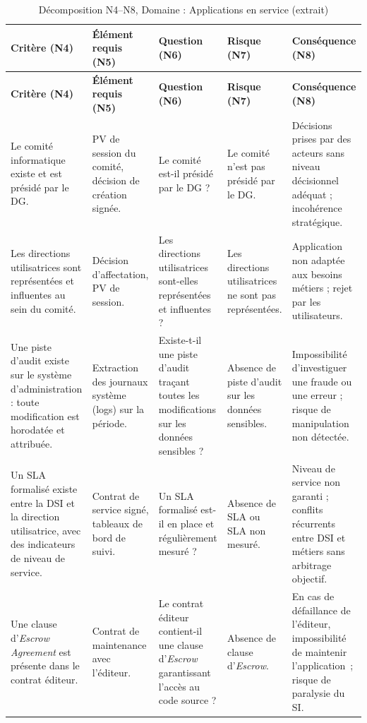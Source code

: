 \begin{longtable}{p{3cm} p{3cm} p{3cm} p{3cm} p{3cm}}
\caption{Décomposition N4--N8, Domaine : Applications en service (extrait)} \\

\toprule
\textbf{Critère (N4)} & \textbf{Élément requis (N5)} & \textbf{Question (N6)} & \textbf{Risque (N7)} & \textbf{Conséquence (N8)} \\
\midrule
\endfirsthead

\toprule
\textbf{Critère (N4)} & \textbf{Élément requis (N5)} & \textbf{Question (N6)} & \textbf{Risque (N7)} & \textbf{Conséquence (N8)} \\
\midrule
\endhead

\bottomrule
\endlastfoot

Le comité informatique existe et est présidé par le DG. &
PV de session du comité, décision de création signée. &
Le comité est-il présidé par le DG ? &
Le comité n'est pas présidé par le DG. &
Décisions prises par des acteurs sans niveau décisionnel adéquat ; incohérence stratégique. \\

\addlinespace

Les directions utilisatrices sont représentées et influentes au sein du comité. &
Décision d'affectation, PV de session. &
Les directions utilisatrices sont-elles représentées et influentes ? &
Les directions utilisatrices ne sont pas représentées. &
Application non adaptée aux besoins métiers ; rejet par les utilisateurs. \\

\addlinespace

Une piste d'audit existe sur le système d'administration : toute modification est horodatée et attribuée. &
Extraction des journaux système (logs) sur la période. &
Existe-t-il une piste d'audit traçant toutes les modifications sur les données sensibles ? &
Absence de piste d'audit sur les données sensibles. &
Impossibilité d'investiguer une fraude ou une erreur ; risque de manipulation non détectée. \\

\addlinespace

Un SLA formalisé existe entre la DSI et la direction utilisatrice, avec des indicateurs de niveau de service. &
Contrat de service signé, tableaux de bord de suivi. &
Un SLA formalisé est-il en place et régulièrement mesuré ? &
Absence de SLA ou SLA non mesuré. &
Niveau de service non garanti ; conflits récurrents entre DSI et métiers sans arbitrage objectif. \\

\addlinespace

Une clause d'\textit{Escrow Agreement} est présente dans le contrat éditeur. &
Contrat de maintenance avec l'éditeur. &
Le contrat éditeur contient-il une clause d'\textit{Escrow} garantissant l'accès au code source ? &
Absence de clause d'\textit{Escrow}. &
En cas de défaillance de l'éditeur, impossibilité de maintenir l'application~; risque de paralysie du SI. \\

\end{longtable}
